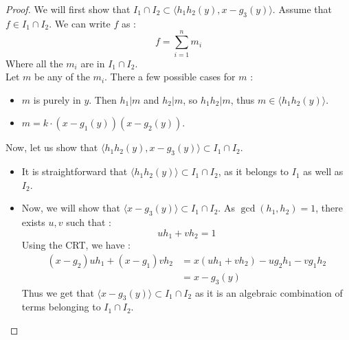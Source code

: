 \documentclass{article}
\begin{document}
\begin{proof}
    We will first show that $I_{1} \cap I_{2} \subset \langle h_{1}h_{2}(y), x - g_{3}(y) \rangle$.
    Assume that $f \in I_{1} \cap I_{2}$. We can write $f$ as : 
    \begin{displaymath}
        f = \sum_{i = 1}^{n} m_{i}
    \end{displaymath}
    Where all the $m_{i}$ are in $I_{1} \cap I_{2}$. \\
    Let $m$ be any of the $m_{i}$. There a few possible cases for $m$ : 
    \begin{itemize}
        \item $m$ is purely in $y$. Then $h_{1} | m$ and $h_{2} | m$, so $h_{1}h_{2} | m$, thus $m \in \langle h_{1}h_{2}(y) \rangle$.
        \item $m = k \cdot (x - g_{1}(y)) (x - g_{2}(y))$. 
    \end{itemize}
    
    Now, let us show that $\langle h_{1}h_{2}(y), x - g_{3}(y) \rangle \subset I_{1} \cap I_{2}$.
    \begin{itemize}
        \item It is straightforward that $\langle h_{1}h_{2}(y) \rangle \subset I_{1} \cap I_{2}$, as it belongs to $I_{1}$ as well as $I_{2}$.
        \item Now, we will show that  $\langle x - g_{3}(y) \rangle \subset I_{1} \cap I_{2}$. As $\gcd(h_{1}, h_{2}) = 1$, there exists $u, v$ such that : 
        \begin{displaymath}
            uh_{1} + vh_{2} = 1
        \end{displaymath}
        Using the CRT, we have : 
        \begin{align*}
            (x - g_{2})uh_{1} + (x - g_{1})vh_{2} 
            & = x(uh_{1} + vh_{2}) - ug_{2}h_{1} - vg_{1}h_{2} \\
            & = x - g_{3}(y)
        \end{align*}
        Thus we get that $\langle x - g_{3}(y) \rangle \subset I_{1} \cap I_{2}$ as it is an algebraic combination of terms belonging to $I_{1} \cap I_{2}$.

    \end{itemize}

\end{proof}
\end{document}
